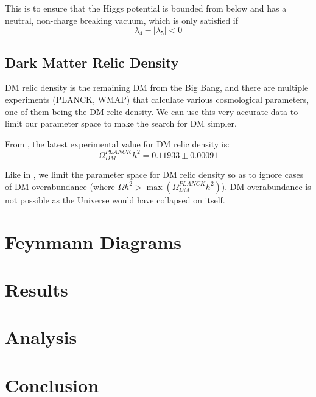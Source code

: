 \documentclass[12pt]{article}
\begin{document}
This is to ensure that the Higgs potential is bounded from below and has a neutral, non-charge breaking vacuum, which is only satisfied if
\begin{equation}
    \lambda_4 - |\lambda_5| < 0
\end{equation}

\subsection{Dark Matter Relic Density}
\label{sec:relic density}
DM relic density is the remaining DM from the Big Bang, and there are multiple experiments (PLANCK, WMAP) that calculate various cosmological parameters, one of them being the DM relic density. We can use this very accurate data to limit our parameter space to make the search for DM simpler.

From \cite{Planck:2018vyg}, the latest experimental value for DM relic density is:
\begin{equation}
    \Omega ^{PLANCK}_{DM} h^2 = 0.11933 \pm 0.00091
\end{equation}

Like in \cite{Belyaev:2016lok}, we limit the parameter space for DM relic density so as to ignore cases of DM overabundance (where $\Omega h^2 > \max(\Omega^{PLANCK}_{DM}h^2)$). DM overabundance is not possible as the Universe would have collapsed on itself. %


\section{Feynmann Diagrams}

\section{Results}
\label{sec:results}

\section{Analysis}
\label{sec:analysis}

\section{Conclusion}
\label{sec:conclusion}

\newpage


\end{document}
